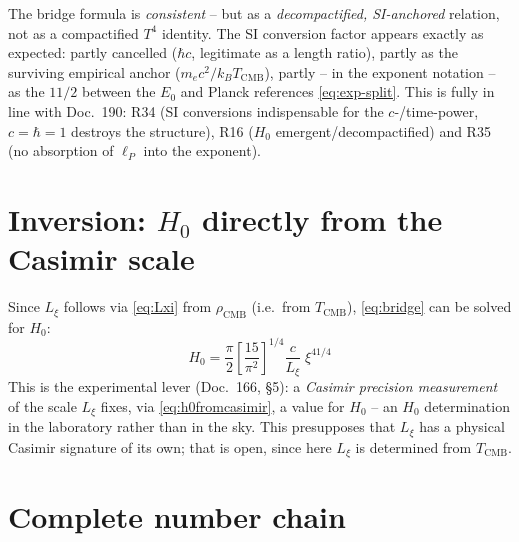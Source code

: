 The bridge formula is \emph{consistent} -- but as a \emph{decompactified,
SI-anchored} relation, not as a compactified $T^4$ identity. The SI conversion
factor appears exactly as expected: partly cancelled ($\hbar c$, legitimate as
a length ratio), partly as the surviving empirical anchor
($m_e c^2/k_B T_\text{CMB}$), partly -- in the exponent notation -- as the
$11/2$ between the $E_0$ and Planck references \eqref{eq:exp-split}. This is
fully in line with Doc.~190: R34 (SI conversions indispensable for the
$c$-/time-power, $c=\hbar=1$ destroys the structure), R16 ($H_0$
emergent/decompactified) and R35 (no absorption of $\ell_P$ into the exponent).

\section{Inversion: $H_0$ directly from the Casimir scale}

Since $L_\xi$ follows via \eqref{eq:Lxi} from $\rho_\text{CMB}$ (i.e.\ from
$T_\text{CMB}$), \eqref{eq:bridge} can be solved for $H_0$:
\begin{equation}
  \boxed{\;H_0 = \frac{\pi}{2}\left[\frac{15}{\pi^2}\right]^{1/4}
  \frac{c}{L_\xi}\;\xi^{41/4}\;}
  \label{eq:h0fromcasimir}
\end{equation}
This is the experimental lever (Doc.~166, §5): a \emph{Casimir precision
measurement} of the scale $L_\xi$ fixes, via \eqref{eq:h0fromcasimir}, a value
for $H_0$ -- an $H_0$ determination in the laboratory rather than in the sky.
This presupposes that $L_\xi$ has a physical Casimir signature of its own; that
is open, since here $L_\xi$ is determined from $T_\text{CMB}$.

\section{Complete number chain}


